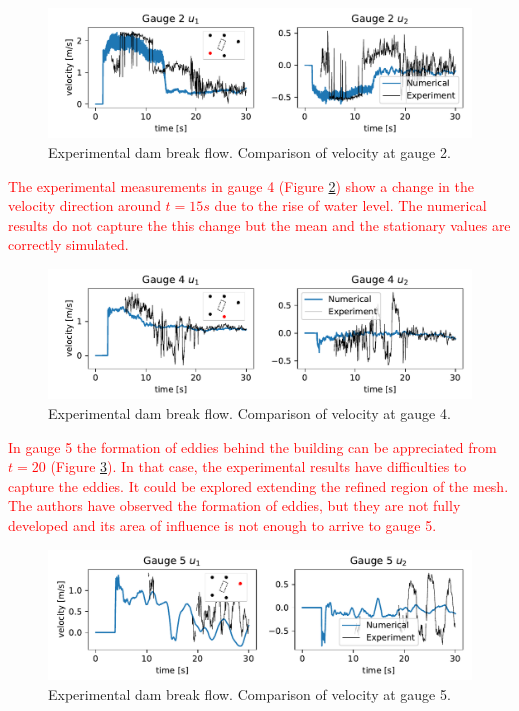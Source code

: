 \documentclass[a4paper,12pt]{elsarticle}
\newcommand{\Miguel}[1]{\textcolor{red}{#1}}
\begin{document}
\begin{figure}
\centering
\includegraphics[width=\textwidth]{img/exp/gauge2_vel.pdf}
\caption{Experimental dam break flow. Comparison of velocity at gauge 2.}
\label{experiment_gauge2_vel}
\end{figure}

\Miguel{
The experimental measurements in gauge 4 (Figure \ref{experiment_gauge4_vel}) show a change in the velocity direction around $t=15s$ due to the rise of water level. The numerical results do not capture the this change but the mean and the stationary values are correctly simulated.
}

\begin{figure}
\centering
\includegraphics[width=\textwidth]{img/exp/gauge4_vel.pdf}
\caption{Experimental dam break flow. Comparison of velocity at gauge 4.}
\label{experiment_gauge4_vel}
\end{figure}

\Miguel{
In gauge 5 the formation of eddies behind the building can be appreciated from $t=20$ (Figure \ref{experiment_gauge5_vel}). In that case, the experimental results have difficulties to capture the eddies. It could be explored extending the refined region of the mesh. The authors have observed the formation of eddies, but they are not fully developed and its area of influence is not enough to arrive to gauge 5.
}

\begin{figure}
\centering
\includegraphics[width=\textwidth]{img/exp/gauge5_vel.pdf}
\caption{Experimental dam break flow. Comparison of velocity at gauge 5.}
\label{experiment_gauge5_vel}
\end{figure}
\end{document}
